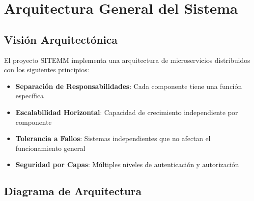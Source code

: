 \documentclass[12pt,a4paper]{article}
\begin{document}
\section{Arquitectura General del Sistema}

\subsection{Visión Arquitectónica}

El proyecto SITEMM implementa una arquitectura de microservicios distribuidos con los siguientes principios:

\begin{itemize}
    \item \textbf{Separación de Responsabilidades}: Cada componente tiene una función específica
    \item \textbf{Escalabilidad Horizontal}: Capacidad de crecimiento independiente por componente
    \item \textbf{Tolerancia a Fallos}: Sistemas independientes que no afectan el funcionamiento general
    \item \textbf{Seguridad por Capas}: Múltiples niveles de autenticación y autorización
\end{itemize}

\subsection{Diagrama de Arquitectura}
\end{document}
